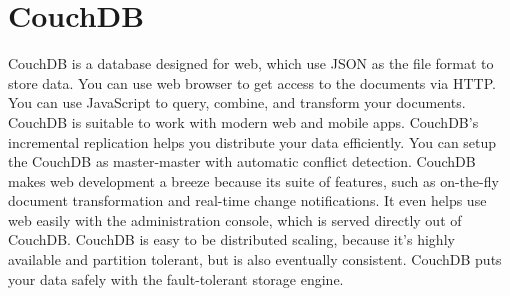 \section{CouchDB}

CouchDB\cite{hid-sp18-515-www-couchdb} is a database designed for web, 
which use JSON as the file format to store data. You can use web 
browser to get access to the documents via HTTP. You can use JavaScript 
to query, combine, and transform your documents. CouchDB is suitable 
to work with modern web and mobile apps. CouchDB's incremental replication 
helps you distribute your data efficiently. You can setup the CouchDB 
as master-master with automatic conflict detection. CouchDB makes 
web development a breeze because its suite of features, such as 
on-the-fly document transformation and real-time change notifications. 
It even helps use web easily with the administration console, which 
is served directly out of CouchDB. CouchDB is easy to be distributed 
scaling, because it's highly available and partition tolerant, but 
is also eventually consistent. CouchDB puts your data safely with 
the fault-tolerant storage engine.

